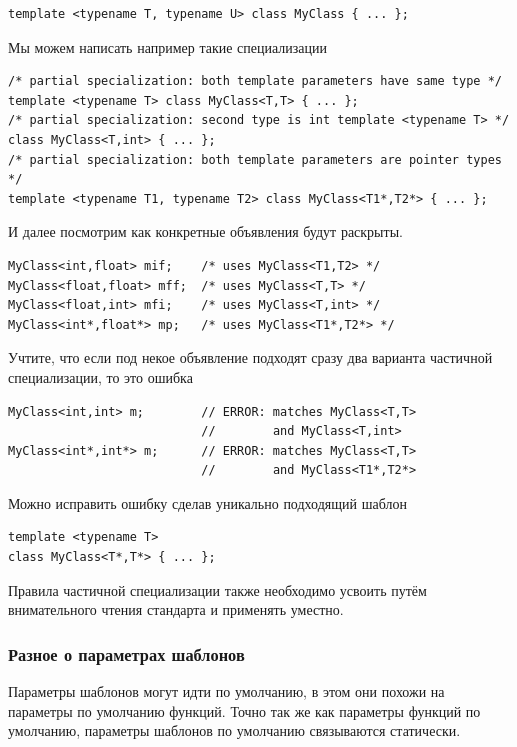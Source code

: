 \documentclass[a4paper,12pt,oneside]{article}
\begin{document}
\begin{lstlisting}
template <typename T, typename U> class MyClass { ... };
\end{lstlisting}

Мы можем написать например такие специализации

\begin{lstlisting}
/* partial specialization: both template parameters have same type */ 
template <typename T> class MyClass<T,T> { ... }; 
/* partial specialization: second type is int template <typename T> */ 
class MyClass<T,int> { ... }; 
/* partial specialization: both template parameters are pointer types */
template <typename T1, typename T2> class MyClass<T1*,T2*> { ... };
\end{lstlisting}

И далее посмотрим как конкретные объявления будут раскрыты.

\begin{lstlisting}
MyClass<int,float> mif;    /* uses MyClass<T1,T2> */ 
MyClass<float,float> mff;  /* uses MyClass<T,T> */ 
MyClass<float,int> mfi;    /* uses MyClass<T,int> */ 
MyClass<int*,float*> mp;   /* uses MyClass<T1*,T2*> */
\end{lstlisting}

Учтите, что если под некое объявление подходят сразу два варианта частичной специализации, то это ошибка

\begin{lstlisting}
MyClass<int,int> m;        // ERROR: matches MyClass<T,T> 
                           //        and MyClass<T,int> 
MyClass<int*,int*> m;      // ERROR: matches MyClass<T,T> 
                           //        and MyClass<T1*,T2*>
\end{lstlisting}

Можно исправить ошибку сделав уникально подходящий шаблон

\begin{lstlisting}
template <typename T> 
class MyClass<T*,T*> { ... };
\end{lstlisting}

Правила частичной специализации также необходимо усвоить путём внимательного чтения стандарта и применять уместно.

\subsubsection{Разное о параметрах шаблонов}

Параметры шаблонов могут идти по умолчанию, в этом они похожи на параметры по умолчанию функций. Точно так же как параметры функций по умолчанию, параметры шаблонов по умолчанию связываются статически.
\end{document}
